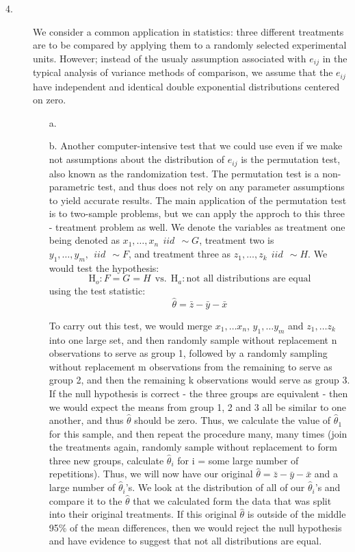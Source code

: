 \documentclass[12pt]{article}
\begin{document}
\begin{description}
\item[4.] We consider a common application in statistics: three different treatments are to be compared by applying them to a randomly selected experimental units. However; instead of the usualy assumption associated with $e_{ij}$ in the typical analysis of variance methods of comparison, we assume that the $e_{ij}$  have independent and identical double exponential distributions centered on zero.
\begin{itemize}
\item[a.]
\item[b.] Another computer-intensive test that we could use even if we make not assumptions about the distribution of $e_{ij}$ is the permutation test, also known as the randomization test. The permutation test is a non-parametric test, and thus does not rely on any parameter assumptions to yield accurate results. The main application of the permutation test is to two-sample problems, but we can apply the approch to this three - treatment problem as well. We denote the variables as treatment one being denoted as $x_1, \dots, x_n  \ \ iid \ \ \sim G$, treatment two is $y_1, \dots, y_m, \ \ iid \ \ \sim F$, and treatment three as $z_1, \dots, z_k \ \ iid \ \ \sim H$. We would test the hypothesis:
\[\text{H}_o: F = G = H \ \ \text{vs.} \ \ \text{H}_a: \text{not all distributions are equal}\]
using the test statistic:
\[\hat{\theta} = \bar{z} - \bar{y} - \bar{x}\]

To carry out this test, we would merge $x_1, \dots x_n$, $y_1, \dots y_m$ and $z_1, \dots z_k$ into one large set, and then randomly sample without replacement n observations to serve as group 1, followed by a randomly sampling without replacement  m observations from the remaining to serve as group 2, and then the remaining k observations would serve as group 3. If the null hypothesis is correct - the three groups are equivalent - then we would expect the means from group 1, 2 and 3 all be similar to one another, and thus $\hat{\theta}$ should be zero. Thus, we calculate the value of $\hat{\theta}_1$ for this sample, and then repeat the procedure many, many times (join the treatments again, randomly sample without replacement to form three new groups, calculate $\hat{\theta}_i$ for i = some large number of repetitions). Thus, we will now have our original $\hat{\theta} = \bar{z} - \bar{y} - \bar{x}$ and a large number of $\hat{\theta}_i$'s. We look at the distribution of all of our $\hat{\theta}_i$'s and compare it to the $\hat{\theta}$ that we calculated form the data that was split into their original treatments. If this original $\hat{\theta}$ is outside of the middle 95\% of the mean differences, then we would reject the null hypothesis and have evidence to suggest that not all distributions are equal.
\end{itemize}



\end{description}
\end{document}
